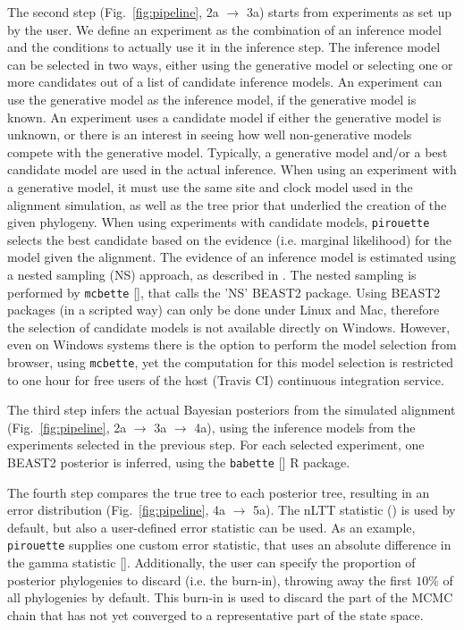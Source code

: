 \documentclass{article}
\begin{document}
The second step (Fig.~\ref{fig:pipeline}, 2a $\rightarrow$ 3a)
starts from experiments as set up by the user. 
We define an experiment as the combination of an inference model 
and the conditions to actually use it in the inference step.
The inference model can be selected in two ways, either using the
generative model or selecting one or more candidates out of a list of candidate 
inference models.
An experiment can use the generative model as the inference model, if the 
generative model is known.
An experiment uses a candidate model if either the generative model is unknown,
or there is an interest in seeing how well non-generative models compete with
the generative model.
Typically, a generative model and/or a best candidate model are used in the 
actual inference.
When using an experiment with a generative model,
it must use the same site and clock model used in the alignment simulation,
as well as the tree prior that underlied the creation of the given phylogeny. 
When using experiments with candidate models,
\verb;pirouette; selects the best candidate based
on the evidence (i.e. marginal likelihood) for the model given the alignment.
The evidence of an inference model is estimated using a nested sampling (NS)
approach, as described in \cite{maturana2018model}. The nested sampling is
performed by \verb;mcbette; [\cite{mcbette}], that calls the 'NS' BEAST2 
package. 
Using BEAST2 packages (in a scripted way) can only be done under Linux and Mac,
therefore the selection of candidate models is not available directly on 
Windows. 
However, even on Windows systems there is the option to perform the model 
selection from browser, using \verb;mcbette;, yet the computation for this 
model selection is
restricted to one hour for free users of the host (Travis CI) continuous
integration service.

The third step infers the actual Bayesian posteriors from the simulated 
alignment (Fig.~\ref{fig:pipeline}, 2a $\rightarrow$ 3a $\rightarrow$ 4a),
using the inference models from the experiments selected in the previous step. 
For each selected experiment, one BEAST2 posterior is inferred, using the 
\verb;babette; [\cite{bilderbeek2018babette}] R package.

The fourth step compares the true tree to each posterior tree, resulting in an 
error distribution (Fig.~\ref{fig:pipeline}, 4a $\rightarrow$ 5a).
The nLTT statistic (\cite{janzen2015approximate}) is used by default, but also 
a user-defined error statistic can be used. 
As an example, \verb;pirouette; supplies one custom error statistic,
that uses an absolute difference in the gamma statistic 
[\cite{pybus2000testing}].
Additionally, the user can specify the proportion of posterior phylogenies to 
discard (i.e. the burn-in), throwing away the first $10\%$
of all phylogenies by default. This burn-in is used to discard
the part of the MCMC chain that has not yet converged to a
representative part of the state space.
\end{document}
